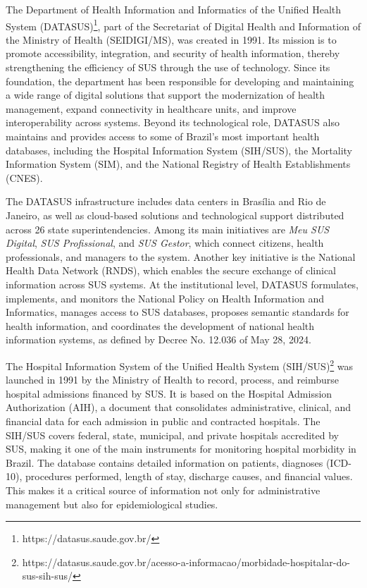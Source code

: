 \documentclass[sigconf,natbib=false]{acmart}
\begin{document}
The Department of Health Information and Informatics of the Unified Health System (DATASUS)\footnote{https://datasus.saude.gov.br/}, part of the Secretariat of Digital Health and Information of the Ministry of Health (SEIDIGI/MS), was created in 1991. Its mission is to promote accessibility, integration, and security of health information, thereby strengthening the efficiency of SUS through the use of technology. Since its foundation, the department has been responsible for developing and maintaining a wide range of digital solutions that support the modernization of health management, expand connectivity in healthcare units, and improve interoperability across systems. Beyond its technological role, DATASUS also maintains and provides access to some of Brazil’s most important health databases, including the Hospital Information System (SIH/SUS), the Mortality Information System (SIM), and the National Registry of Health Establishments (CNES).

The DATASUS infrastructure includes data centers in Brasília and Rio de Janeiro, as well as cloud-based solutions and technological support distributed across 26 state superintendencies. Among its main initiatives are \textit{Meu SUS Digital}, \textit{SUS Profissional}, and \textit{SUS Gestor}, which connect citizens, health professionals, and managers to the system. Another key initiative is the National Health Data Network (RNDS), which enables the secure exchange of clinical information across SUS systems. At the institutional level, DATASUS formulates, implements, and monitors the National Policy on Health Information and Informatics, manages access to SUS databases, proposes semantic standards for health information, and coordinates the development of national health information systems, as defined by Decree No. 12.036 of May 28, 2024.

The Hospital Information System of the Unified Health System (SIH/SUS)\footnote{https://datasus.saude.gov.br/acesso-a-informacao/morbidade-hospitalar-do-sus-sih-sus/} was launched in 1991 by the Ministry of Health to record, process, and reimburse hospital admissions financed by SUS. It is based on the Hospital Admission Authorization (AIH), a document that consolidates administrative, clinical, and financial data for each admission in public and contracted hospitals. The SIH/SUS covers federal, state, municipal, and private hospitals accredited by SUS, making it one of the main instruments for monitoring hospital morbidity in Brazil. The database contains detailed information on patients, diagnoses (ICD-10), procedures performed, length of stay, discharge causes, and financial values. This makes it a critical source of information not only for administrative management but also for epidemiological studies.
\end{document}

